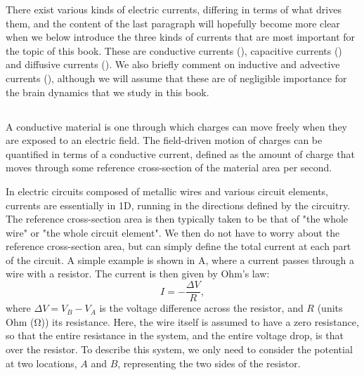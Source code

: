 There exist various kinds of electric currents, differing in terms of what drives them, and the content of the last paragraph will hopefully become more clear when we below introduce the three kinds of currents that are most important for the topic of this book. These are conductive currents (), capacitive currents () and diffusive currents (). We also briefly comment on inductive and advective currents (), although we will assume that these are of negligible importance for the brain dynamics that we study in this book. 


\subsection{}
\label{sec:Basics:ConductiveCurrent}
A conductive material  is one through which charges can move freely when they are exposed to an electric field. The field-driven motion of charges can be quantified in terms of a conductive current, defined as the amount of charge that moves through some reference cross-section of the material area per second.

In electric circuits composed of metallic wires and various circuit elements, currents are essentially in 1D, running in the directions defined by the circuitry. The reference cross-section area is then typically taken to be that of "the whole wire" or "the whole circuit element". We then do not have to worry about the reference cross-section area, but can simply define the total current at each part of the circuit. A simple example is shown in A, where a current passes through a wire with a resistor. The current is then given by Ohm's law:
\begin{equation}
I = - \frac{\Delta V}{R},
\label{eq:Basics:Ohm_R}
\end{equation}
where $\Delta V = V_B-V_A$ is the voltage difference across the resistor, and $R$ (units Ohm (\si{\ohm})) its resistance. Here, the wire itself is assumed to have a zero resistance, so that the entire resistance in the system, and the entire voltage drop, is that over the resistor. To describe this system, we only need to consider the potential at two locations, $A$ and $B$, representing the two sides of the resistor.

